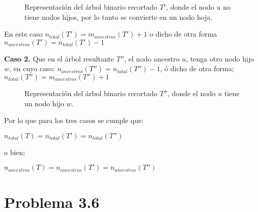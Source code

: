 \documentclass{article}
\begin{document}
\begin{figure}[h!]
    \begin{center}		
    \end{center}
    \caption{Representación del árbol binario recortado $T'$, donde el nodo $u$ no
    tiene nodos hijos, por lo tanto se convierte en un nodo hoja.}
\end{figure}

En este caso $n_{total}(T') = m_{ancestros}(T') + 1$ o dicho de otra forma
$n_{ancestros}(T') = n_{total}(T') - 1$

\textbf{Caso 2.} Que en el árbol resultante $T''$, el nodo ancestro $u$, tenga
otro nodo hijo $w$, en cuyo caso: $n_{ancestros}(T'') = n_{total}(T'') - 1$, ó dicho de
otra forma; $n_{total}(T'') = m_{ancestros}(T'') + 1$

\begin{figure}[h!]
    \begin{center}		
    \end{center}
    \caption{Representación del árbol binario recortado $T''$, donde el nodo $u$ tiene
    un nodo hijo $w$.}
\end{figure}

Por lo que para los tres casos se cumple que:

$n_{total}(T) = n_{total}(T') =
n_{total}(T'')$

o bien; 

$n_{ancestros}(T) = n_{ancestros}(T') = n_{ancestros}(T'')$

\section*{Problema 3.6}
\end{document}
